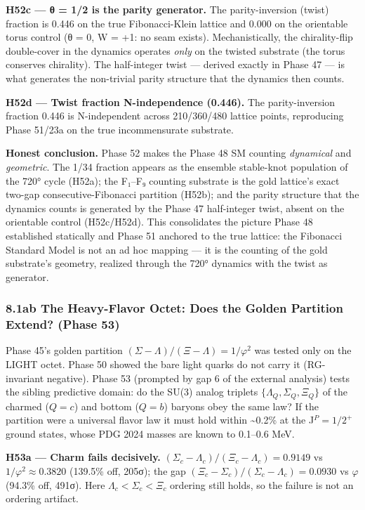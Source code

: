 \documentclass[
]{article}
\begin{document}
\textbf{H52c --- θ = 1/2 is the parity generator.} The parity-inversion
(twist) fraction is 0.446 on the true Fibonacci-Klein lattice and 0.000
on the orientable torus control (θ = 0, W = +1: no seam exists).
Mechanistically, the chirality-flip double-cover in the dynamics
operates \emph{only} on the twisted substrate (the torus conserves
chirality). The half-integer twist --- derived exactly in Phase 47 ---
is what generates the non-trivial parity structure that the dynamics
then counts.

\textbf{H52d --- Twist fraction N-independence (0.446).} The
parity-inversion fraction 0.446 is N-independent across 210/360/480
lattice points, reproducing Phase 51/23a on the true incommensurate
substrate.

\textbf{Honest conclusion.} Phase 52 makes the Phase 48 SM counting
\emph{dynamical} and \emph{geometric}. The 1/34 fraction appears as the
ensemble stable-knot population of the 720° cycle (H52a); the F₁--F₉
counting substrate is the gold lattice's exact two-gap
consecutive-Fibonacci partition (H52b); and the parity structure that
the dynamics counts is generated by the Phase 47 half-integer twist,
absent on the orientable control (H52c/H52d). This consolidates the
picture Phase 48 established statically and Phase 51 anchored to the
true lattice: the Fibonacci Standard Model is not an ad hoc mapping ---
it is the counting of the gold substrate's geometry, realized through
the 720° dynamics with the twist as generator.

\subsubsection{8.1ab The Heavy-Flavor Octet: Does the Golden Partition
Extend? (Phase
53)}\label{ab-the-heavy-flavor-octet-does-the-golden-partition-extend-phase-53}

Phase 45's golden partition
\((\Sigma-\Lambda)/(\Xi-\Lambda) = 1/\varphi^2\) was tested only on the
LIGHT octet. Phase 50 showed the bare light quarks do not carry it
(RG-invariant negative). Phase 53 (prompted by gap 6 of the external
analysis) tests the sibling predictive domain: do the SU(3) analog
triplets \(\{\Lambda_Q, \Sigma_Q, \Xi_Q\}\) of the charmed (\(Q=c\)) and
bottom (\(Q=b\)) baryons obey the same law? If the partition were a
universal flavor law it must hold within \textasciitilde0.2\% at the
J\(^P = 1/2^+\) ground states, whose PDG 2024 masses are known to
0.1--0.6 MeV.

\textbf{H53a --- Charm fails decisively.}
\((\Sigma_c-\Lambda_c)/(\Xi_c-\Lambda_c) = 0.9149\) vs
\(1/\varphi^2 \approx 0.3820\) (139.5\% off, 205σ); the gap
\((\Xi_c-\Sigma_c)/(\Sigma_c-\Lambda_c) = 0.0930\) vs \(\varphi\)
(94.3\% off, 491σ). Here \(\Lambda_c < \Sigma_c < \Xi_c\) ordering still
holds, so the failure is not an ordering artifact.
\end{document}
